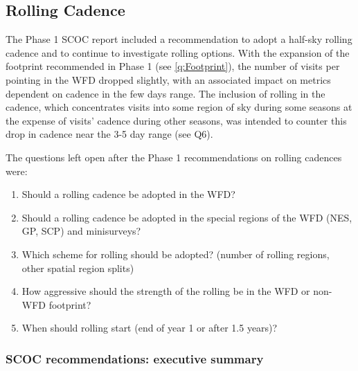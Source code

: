 \subsection{Rolling Cadence} \label{q:Rolling}

The Phase 1 SCOC report included a recommendation to adopt a half-sky rolling cadence and to continue to investigate rolling options. With the expansion of the footprint recommended in Phase 1 (see \autoref{q:Footprint}), the number of visits per pointing in the WFD dropped slightly, with an associated impact on metrics dependent on cadence in the few days range. The inclusion of rolling in the cadence, which concentrates visits into some region of sky during some seasons at the expense of visits' cadence during other seasons, was intended to counter this drop in cadence near the 3-5 day range (see  Q6).


The questions left open after the Phase 1 recommendations on rolling cadences were: 

\begin{enumerate}
\item Should a rolling cadence be adopted in the WFD?
\item Should a rolling cadence be adopted in the special regions of the WFD (NES, GP, SCP) and minisurveys?
\item Which scheme for rolling should be adopted? (number of rolling regions, other spatial region splits)
\item How aggressive should the strength of the rolling be in the WFD or non-WFD footprint?
\item When should rolling start (end of year 1 or after 1.5 years)?
\end{enumerate}

\subsubsection{SCOC recommendations: executive summary}\label{sec:rolling}

